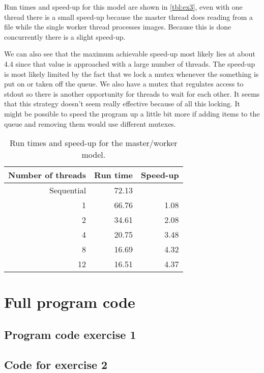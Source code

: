 \documentclass[a4paper]{article}
\begin{document}
Run times and speed-up for this model are shown in \autoref{tbl:ex3}, even with one thread there is a small speed-up because the master thread does reading from a file while the single worker thread processes images. Because this is done concurrently there is a slight speed-up. 

We can also see that the maximum achievable speed-up most likely lies at about 4.4 since that value is approached with a large number of threads. The speed-up is most likely limited by the fact that we lock a mutex whenever the something is put on or taken off the queue. We also have a mutex that regulates access to stdout so there is another opportunity for threads to wait for each other. It seems that this strategy doesn't seem really effective because of all this locking. It might be possible to speed the program up a little bit more if adding items to the queue and removing them would use different mutexes.

\begin{table}
	\centering
	\caption{Run times and speed-up for the master/worker model.}
	\label{tbl:ex3}
	\begin{tabular}{r|r|r}
		Number of threads & Run time & Speed-up \\ \hline
		Sequential & 72.13 &  \\
		 1 & 66.76 & 1.08 \\
		 2 & 34.61 & 2.08 \\
		 4 & 20.75 & 3.48 \\
		 8 & 16.69 & 4.32 \\
		12 & 16.51 & 4.37 \\
	\end{tabular}
\end{table}

\clearpage
\appendix
\section{Full program code}
\subsection{Program code exercise 1}
%

\subsection{Code for exercise 2}

\end{document}
